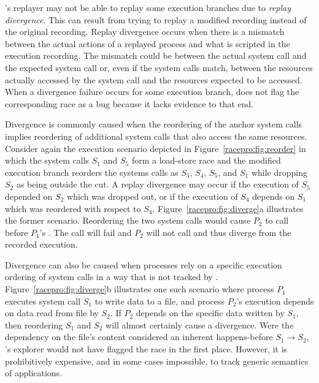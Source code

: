 \racepro's replayer may not be able to replay some execution branches due
to \emph{replay divergence}.  This can result from trying to replay a
modified recording instead of the original recording.
Replay divergence occurs when there is a mismatch between the actual
actions of a replayed process and what
is scripted in the execution recording. The mismatch could be between
the actual system call and the expected system call or, even if the
system calls match, between the resources actually accessed by the
system call and the resources expected to be accessed.  When a
divergence failure occurs for some execution branch, \racepro does not
flag the corresponding race as a bug because it lacks evidence to that
end.

Divergence is commonly caused when the reordering of the anchor system
calls implies reordering of additional system calls that also access
the same resources. Consider again the execution scenario depicted in
Figure~\ref{racepro:fig:reorder} in which the system calls $S_1$ and
$S_5$ form a load-store race and the modified execution branch
reorders the systems calls as $S_3$, $S_4$, $S_5$, and $S_1$ while
dropping $S_2$ as being outside the cut.  A replay divergence may
occur if the execution of $S_5$ depended on $S_2$ which was dropped
out, or if the execution of $S_4$ depends on $S_1$ which was reordered
with respect to $S_4$. Figure~\ref{racepro:fig:diverge}a illustrates the
former scenario.   Reordering the two  system calls would cause
$P_2$ to call  before $P_1$'s .  The call will fail
and $P_2$ will not call  and thus diverge from the recorded
execution. 

Divergence can also be caused when processes rely on a specific
execution ordering of system calls in a way that is not tracked by
\racepro.  Figure~\ref{racepro:fig:diverge}b illustrates one such scenario where
process $P_1$ executes system call $S_1$ to write data to a file, and
process $P_2$'s execution depends on data read from file by $S_2$. If
$P_2$ depends on the specific data written by $S_1$, then reordering
$S_1$ and $S_2$ will almost certainly cause a divergence. Were the
dependency on the file's content considered an inherent happens-before
$S_1 \rightarrow S_2$, \racepro's explorer would not have flagged the race
in the first place. However, it is prohibitively expensive, and in
some cases impossible, to track generic semantics of applications.

